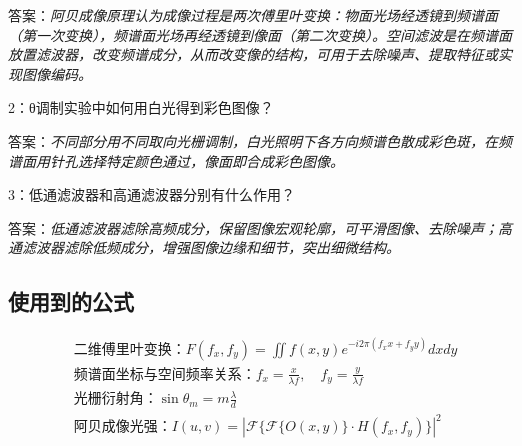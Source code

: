\documentclass[10pt,journal,compsoc]{IEEEtran}
\begin{document}
答案：\textit{阿贝成像原理认为成像过程是两次傅里叶变换：物面光场经透镜到频谱面（第一次变换），频谱面光场再经透镜到像面（第二次变换）。空间滤波是在频谱面放置滤波器，改变频谱成分，从而改变像的结构，可用于去除噪声、提取特征或实现图像编码。}

2：θ调制实验中如何用白光得到彩色图像？

答案：\textit{不同部分用不同取向光栅调制，白光照明下各方向频谱色散成彩色斑，在频谱面用针孔选择特定颜色通过，像面即合成彩色图像。}

3：低通滤波器和高通滤波器分别有什么作用？

答案：\textit{低通滤波器滤除高频成分，保留图像宏观轮廓，可平滑图像、去除噪声；高通滤波器滤除低频成分，增强图像边缘和细节，突出细微结构。}

\subsection{使用到的公式}
\begin{align*}
&\text{二维傅里叶变换：}F(f_x, f_y) = \iint f(x,y) e^{-i2\pi (f_x x + f_y y)} dx dy \\
&\text{频谱面坐标与空间频率关系：}f_x = \frac{x}{\lambda f},\quad f_y = \frac{y}{\lambda f} \\
&\text{光栅衍射角：}\sin\theta_m = m\frac{\lambda}{d} \\
&\text{阿贝成像光强：}I(u,v) = |\mathcal{F}\{ \mathcal{F}\{O(x,y)\} \cdot H(f_x, f_y) \}|^2
\end{align*}
\end{document}
